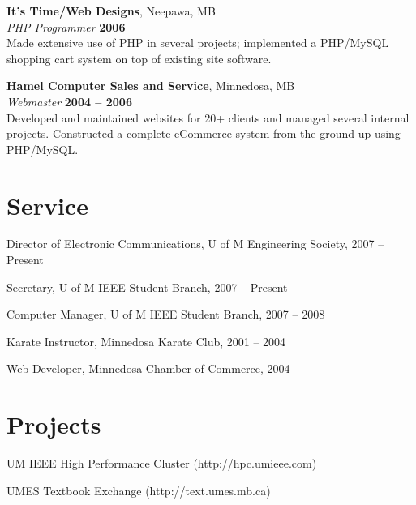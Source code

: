 \documentclass[margin,line,letterpaper]{resume}
\begin{document}
\begin{resume}
  {\bf It's Time/Web Designs}, Neepawa, MB \vspace{2mm}\\\vspace{1mm}%
  {\sl PHP Programmer} \hfill {\bf 2006}\\
  Made extensive use of PHP in several projects; implemented a PHP/MySQL shopping cart
  system on top of existing site software.

  {\bf Hamel Computer Sales and Service}, Minnedosa, MB \vspace{2mm}\\\vspace{1mm}%
  {\sl Webmaster} \hfill {\bf 2004 -- 2006}\\
  Developed and maintained websites for 20+ clients and managed several internal projects.
  Constructed a complete eCommerce system from the ground up using PHP/MySQL.

  \newpage
  \section{\mysidestyle Service}

  \begin{list2}
    \item Director of Electronic Communications, U of M Engineering Society, 2007 -- Present
    \item Secretary, U of M IEEE Student Branch, 2007 -- Present
    \item Computer Manager, U of M IEEE Student Branch, 2007 -- 2008
    \item Karate Instructor, Minnedosa Karate Club, 2001 -- 2004
    \item Web Developer, Minnedosa Chamber of Commerce, 2004
  \end{list2}

  \section{\mysidestyle Projects}

  \begin{list2}
    \item UM IEEE High Performance Cluster (http://hpc.umieee.com)
    \item UMES Textbook Exchange (http://text.umes.mb.ca)
  \end{list2}



\end{resume}
\end{document}
